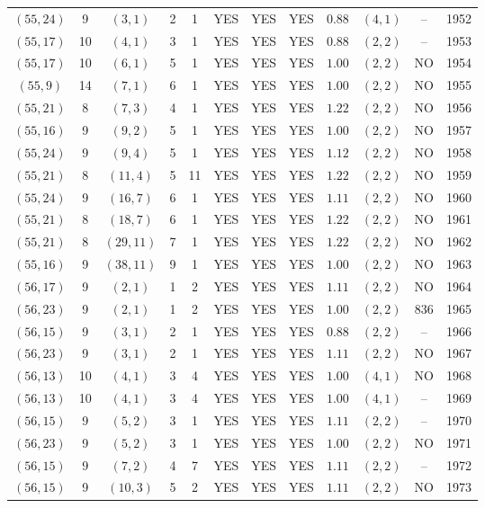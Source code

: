\begin{longtable}{|c|c|c|c|c|c|c|c|c|c|c|c|}
$(55,24)$ & 9 & $(3,1)$ & 2 & 1 & YES & YES & YES & $0.88$ & $(4,1)$ & -- & 1952\\
$(55,17)$ & 10 & $(4,1)$ & 3 & 1 & YES & YES & YES & $0.88$ & $(2,2)$ & -- & 1953\\
$(55,17)$ & 10 & $(6,1)$ & 5 & 1 & YES & YES & YES & $1.00$ & $(2,2)$ & NO & 1954\\
$(55,9)$ & 14 & $(7,1)$ & 6 & 1 & YES & YES & YES & $1.00$ & $(2,2)$ & NO & 1955\\
$(55,21)$ & 8 & $(7,3)$ & 4 & 1 & YES & YES & YES & $1.22$ & $(2,2)$ & NO & 1956\\
$(55,16)$ & 9 & $(9,2)$ & 5 & 1 & YES & YES & YES & $1.00$ & $(2,2)$ & NO & 1957\\
$(55,24)$ & 9 & $(9,4)$ & 5 & 1 & YES & YES & YES & $1.12$ & $(2,2)$ & NO & 1958\\
$(55,21)$ & 8 & $(11,4)$ & 5 & 11 & YES & YES & YES & $1.22$ & $(2,2)$ & NO & 1959\\
$(55,24)$ & 9 & $(16,7)$ & 6 & 1 & YES & YES & YES & $1.11$ & $(2,2)$ & NO & 1960\\
$(55,21)$ & 8 & $(18,7)$ & 6 & 1 & YES & YES & YES & $1.22$ & $(2,2)$ & NO & 1961\\
$(55,21)$ & 8 & $(29,11)$ & 7 & 1 & YES & YES & YES & $1.22$ & $(2,2)$ & NO & 1962\\
$(55,16)$ & 9 & $(38,11)$ & 9 & 1 & YES & YES & YES & $1.00$ & $(2,2)$ & NO & 1963\\
$(56,17)$ & 9 & $(2,1)$ & 1 & 2 & YES & YES & YES & $1.11$ & $(2,2)$ & NO & 1964\\
$(56,23)$ & 9 & $(2,1)$ & 1 & 2 & YES & YES & YES & $1.00$ & $(2,2)$ & 836 & 1965\\
$(56,15)$ & 9 & $(3,1)$ & 2 & 1 & YES & YES & YES & $0.88$ & $(2,2)$ & -- & 1966\\
$(56,23)$ & 9 & $(3,1)$ & 2 & 1 & YES & YES & YES & $1.11$ & $(2,2)$ & NO & 1967\\
$(56,13)$ & 10 & $(4,1)$ & 3 & 4 & YES & YES & YES & $1.00$ & $(4,1)$ & NO & 1968\\
$(56,13)$ & 10 & $(4,1)$ & 3 & 4 & YES & YES & YES & $1.00$ & $(4,1)$ & -- & 1969\\
$(56,15)$ & 9 & $(5,2)$ & 3 & 1 & YES & YES & YES & $1.11$ & $(2,2)$ & -- & 1970\\
$(56,23)$ & 9 & $(5,2)$ & 3 & 1 & YES & YES & YES & $1.00$ & $(2,2)$ & NO & 1971\\
$(56,15)$ & 9 & $(7,2)$ & 4 & 7 & YES & YES & YES & $1.11$ & $(2,2)$ & -- & 1972\\
$(56,15)$ & 9 & $(10,3)$ & 5 & 2 & YES & YES & YES & $1.11$ & $(2,2)$ & NO & 1973\\

\end{longtable}
